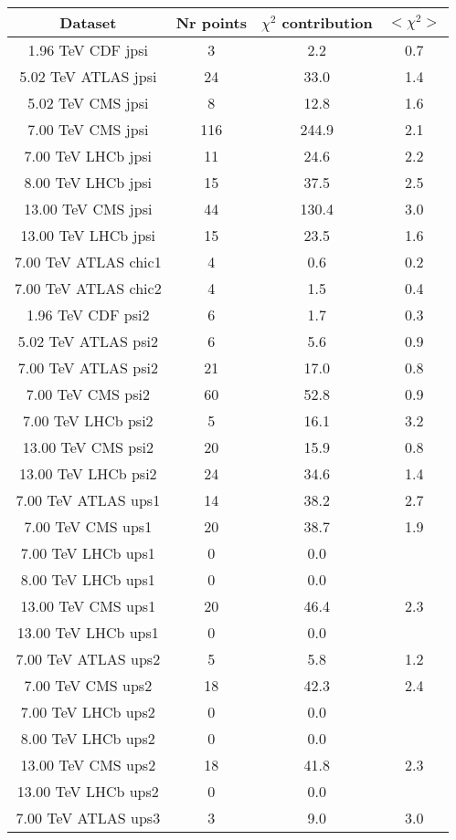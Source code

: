 \begin{table}[h!]
\centering
\begin{tabular}{c|c|c|c}
Dataset & Nr points & $\chi^2$ contribution & $<\chi^2>$ \\
\hline
1.96 TeV CDF jpsi & 3 & 2.2 & 0.7 \\
5.02 TeV ATLAS jpsi & 24 & 33.0 & 1.4 \\
5.02 TeV CMS jpsi & 8 & 12.8 & 1.6 \\
7.00 TeV CMS jpsi & 116 & 244.9 & 2.1 \\
7.00 TeV LHCb jpsi & 11 & 24.6 & 2.2 \\
8.00 TeV LHCb jpsi & 15 & 37.5 & 2.5 \\
13.00 TeV CMS jpsi & 44 & 130.4 & 3.0 \\
13.00 TeV LHCb jpsi & 15 & 23.5 & 1.6 \\
7.00 TeV ATLAS chic1 & 4 & 0.6 & 0.2 \\
7.00 TeV ATLAS chic2 & 4 & 1.5 & 0.4 \\
1.96 TeV CDF psi2 & 6 & 1.7 & 0.3 \\
5.02 TeV ATLAS psi2 & 6 & 5.6 & 0.9 \\
7.00 TeV ATLAS psi2 & 21 & 17.0 & 0.8 \\
7.00 TeV CMS psi2 & 60 & 52.8 & 0.9 \\
7.00 TeV LHCb psi2 & 5 & 16.1 & 3.2 \\
13.00 TeV CMS psi2 & 20 & 15.9 & 0.8 \\
13.00 TeV LHCb psi2 & 24 & 34.6 & 1.4 \\
7.00 TeV ATLAS ups1 & 14 & 38.2 & 2.7 \\
7.00 TeV CMS ups1 & 20 & 38.7 & 1.9 \\
7.00 TeV LHCb ups1 & 0 & 0.0 &  \\
8.00 TeV LHCb ups1 & 0 & 0.0 &  \\
13.00 TeV CMS ups1 & 20 & 46.4 & 2.3 \\
13.00 TeV LHCb ups1 & 0 & 0.0 &  \\
7.00 TeV ATLAS ups2 & 5 & 5.8 & 1.2 \\
7.00 TeV CMS ups2 & 18 & 42.3 & 2.4 \\
7.00 TeV LHCb ups2 & 0 & 0.0 &  \\
8.00 TeV LHCb ups2 & 0 & 0.0 &  \\
13.00 TeV CMS ups2 & 18 & 41.8 & 2.3 \\
13.00 TeV LHCb ups2 & 0 & 0.0 &  \\
7.00 TeV ATLAS ups3 & 3 & 9.0 & 3.0 \\

\end{tabular}
\end{table}
